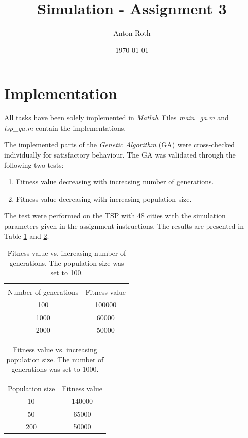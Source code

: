 \documentclass[]{article}
\title{Simulation - Assignment 3}
\author{Anton Roth}
\date{\today}
\begin{document}
\begin{titlepage}
  \maketitle
  \thispagestyle{empty}
\end{titlepage}

\section*{Implementation}
All tasks have been solely implemented in {\it Matlab}. Files \textit{main\_ga.m} and \textit{tsp\_ga.m} contain the implementations.

The implemented parts of the {\it Genetic Algorithm} (GA) were cross-checked individually for satisfactory behaviour.
The GA was validated through the following two tests:
\begin{enumerate}
  \item Fitness value decreasing with increasing number of generations.
  \item Fitness value decreasing with increasing population size.
\end{enumerate}
The test were performed on the TSP with 48 cities with the simulation parameters given in the assignment instructions.
The results are presented in Table \ref{tab:val1} and \ref{tab:val2}.
\begin{table}[H]
  \centering
  \caption{Fitness value vs. increasing number of generations. The population size was set to 100.}
  \begin{tabular}{|c|c|}
    \hline \\
    Number of generations & Fitness value \\ \hline
    100 & 100000 \\ \hline
    1000 & 60000 \\ \hline
    2000 & 50000 \\ \hline
  \end{tabular}
  \label{tab:val1}
\end{table}

\begin{table}[H]
  \centering
  \caption{Fitness value vs. increasing population size. The number of generations was set to 1000.}
  \begin{tabular}{|c|c|}
    \hline \\
    Population size & Fitness value \\ \hline
    10 & 140000 \\ \hline
    50 & 65000 \\ \hline
    200 & 50000 \\ \hline
  \end{tabular}
  \label{tab:val2}
\end{table}
\end{document}
